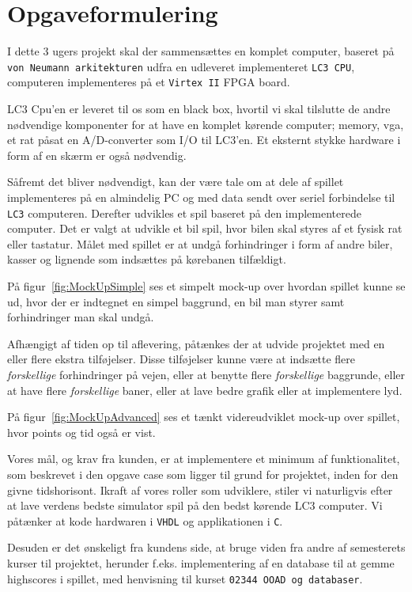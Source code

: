 \chapter{Opgaveformulering}\label{cha:opgaveformulering}
I dette 3 ugers projekt skal der sammensættes en komplet computer, baseret på \texttt{von Neumann arkitekturen} udfra en udleveret implementeret \texttt{LC3 CPU}, computeren implementeres på et \texttt{Virtex II} FPGA board.

LC3 Cpu’en er leveret til os som en black box, hvortil vi skal tilslutte de andre nødvendige komponenter for at have en komplet kørende computer; memory, vga, et rat påsat en A/D-converter som I/O til LC3’en. Et eksternt stykke hardware i form af en skærm er også nødvendig.

Såfremt det bliver nødvendigt, kan der være tale om at dele af spillet implementeres på en almindelig PC og med data sendt over seriel forbindelse til \texttt{LC3} computeren. 
Derefter udvikles et spil baseret på den implementerede computer. Det er valgt at udvikle et bil spil, hvor bilen skal styres af et fysisk rat eller tastatur. Målet med spillet er at undgå forhindringer i form af andre biler, kasser og lignende som indsættes på kørebanen tilfældigt.

På figur~\vref{fig:MockUpSimple} ses et simpelt mock-up over hvordan spillet kunne se ud, hvor der er indtegnet en simpel baggrund, en bil man styrer samt forhindringer man skal undgå.


Afhængigt af tiden op til aflevering, påtænkes der at udvide projektet med en eller flere ekstra tilføjelser. Disse tilføjelser kunne være at indsætte flere \textit{forskellige} forhindringer på vejen, eller at benytte flere \textit{forskellige} baggrunde, eller at have flere \textit{forskellige} baner, eller at lave bedre grafik eller at implementere lyd.

På figur~\vref{fig:MockUpAdvanced} ses et tænkt videreudviklet mock-up over spillet, hvor points og tid også er vist.


Vores mål, og krav fra kunden, er at implementere et minimum af funktionalitet, som beskrevet i den opgave case som ligger til grund for projektet, inden for den givne tidshorisont. Ikraft af vores roller som udviklere, stiler vi naturligvis efter at lave verdens bedste simulator spil på den bedst kørende LC3 computer.     
Vi påtænker at kode hardwaren i \texttt{VHDL} og applikationen i \texttt{C}.

Desuden er det ønskeligt fra kundens side, at bruge viden fra andre af semesterets kurser til projektet, herunder f.eks. implementering af en database til at gemme highscores i spillet, med henvisning til kurset \texttt{02344 OOAD og databaser}.  